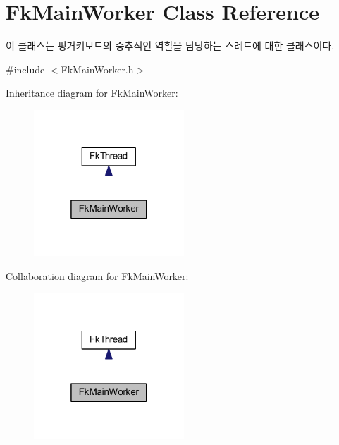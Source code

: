 \hypertarget{class_fk_main_worker}{}\section{Fk\+Main\+Worker Class Reference}
\label{class_fk_main_worker}


이 클래스는 핑거키보드의 중추적인 역할을 담당하는 스레드에 대한 클래스이다.  




{\ttfamily \#include $<$Fk\+Main\+Worker.\+h$>$}



Inheritance diagram for Fk\+Main\+Worker\+:\nopagebreak
\begin{figure}[H]
\begin{center}
\leavevmode
\includegraphics[width=160pt]{class_fk_main_worker__inherit__graph}
\end{center}
\end{figure}


Collaboration diagram for Fk\+Main\+Worker\+:\nopagebreak
\begin{figure}[H]
\begin{center}
\leavevmode
\includegraphics[width=160pt]{class_fk_main_worker__coll__graph}
\end{center}
\end{figure}

